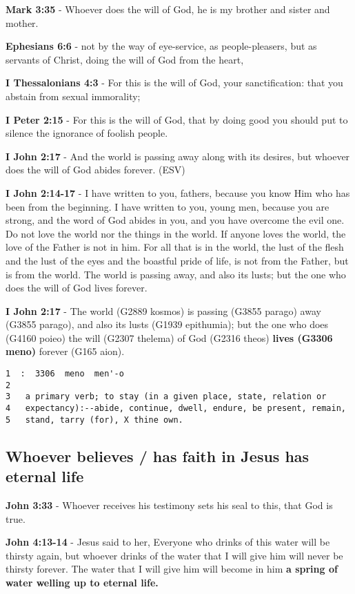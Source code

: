 \documentclass[11pt]{article}
\begin{document}
\textbf{Mark 3:35} - Whoever does the will of God, he is my brother and sister and mother.

\textbf{Ephesians 6:6} - not by the way of eye-service, as people-pleasers, but as servants of Christ, doing the will of God from the heart,

\textbf{I Thessalonians 4:3} - For this is the will of God, your sanctification: that you abstain from sexual immorality;

\textbf{I Peter 2:15} - For this is the will of God, that by doing good you should put to silence the ignorance of foolish people.

\textbf{I John 2:17} - And the world is passing away along with its desires, but whoever does the will of God abides forever. (ESV)

\textbf{I John 2:14-17} - I have written to you, fathers, because you know Him who has been from the beginning. I have written to you, young men, because you are strong, and the word of God abides in you, and you have overcome the evil one.  Do not love the world nor the things in the world. If anyone loves the world, the love of the Father is not in him.  For all that is in the world, the lust of the flesh and the lust of the eyes and the boastful pride of life, is not from the Father, but is from the world.  The world is passing away, and also its lusts; but the one who does the will of God lives forever.

\textbf{I John 2:17} - The world (G2889 kosmos) is passing (G3855 parago) away (G3855 parago), and also its lusts (G1939 epithumia); but the one who does (G4160 poieo) the will (G2307 thelema) of God (G2316 theos) \textbf{lives (G3306 meno)} forever (G165 aion).

\begin{verbatim}
1  :  3306  meno  men'-o
2  
3   a primary verb; to stay (in a given place, state, relation or
4   expectancy):--abide, continue, dwell, endure, be present, remain,
5   stand, tarry (for), X thine own.
\end{verbatim}

\subsection{Whoever believes / has faith in Jesus has eternal life}
\label{sec:org26db81d}
\textbf{John 3:33} - Whoever receives his testimony sets his seal to this, that God is true.

\textbf{John 4:13-14} - Jesus said to her, Everyone who drinks of this water will be thirsty again, but whoever drinks of the water that I will give him will never be thirsty forever. The water that I will give him will become in him \textbf{a spring of water welling up to eternal life.}
\end{document}

